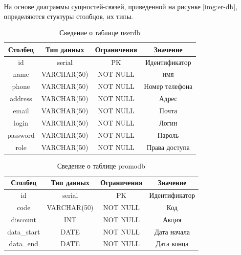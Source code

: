 На основе диаграммы сущностей-связей, приведенной на рисунке \ref{img:er-db}, определяются стуктуры столбцов, их типы.

\begin{table}[H]
	\begin{center}
		\caption{Сведение о таблице userdb}
		\begin{tabular}{|c|c|c|c|}
			\hline
			Столбец & Тип данных & Ограничения & Значение \\
			\hline
			id & serial & PK & Идентификатор \\
			\hline
			name & VARCHAR(50) & NOT NULL & имя \\
			\hline
			phone & VARCHAR(50) & NOT NULL & Номер телефона\\
			\hline
			address & VARCHAR(50) & NOT NULL & Адрес\\
			\hline
			email & VARCHAR(50) & NOT NULL & Почта \\
			\hline
			login & VARCHAR(50) & NOT NULL &  Логин \\
			\hline
			password & VARCHAR(50) & NOT NULL & Пароль \\
			\hline
			role & VARCHAR(50) & NOT NULL & Права доступа \\
			\hline			
		\end{tabular}
		\label{table:db:users}
	\end{center}
\end{table}

\begin{table}[H]
	\begin{center}
		\caption{Сведение о таблице promodb}
		\begin{tabular}{|c|c|c|c|}
			\hline
			Столбец & Тип данных & Ограничения & Значение \\
			\hline
			id & serial & PK & Идентификатор \\
			\hline
			code & VARCHAR(50) & NOT NULL & Код \\
			\hline
			discount & INT & NOT NULL & Акция\\
			\hline
			data\_start & DATE & NOT NULL & Дата начала\\
			\hline
			data\_end & DATE & NOT NULL &  Дата конца\\
			\hline			
		\end{tabular}
		\label{table:db:promodb}
	\end{center}
\end{table}

